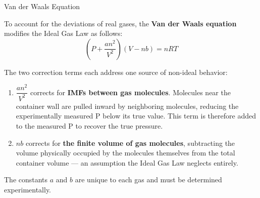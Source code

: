 \documentclass[10pt]{article}
\begin{document}
  \begin{core}{Van der Waals Equation}
      
    To account for the deviations of real gases, the \textbf{Van der Waals equation} modifies the Ideal Gas Law as follows:
    \[
      \left( P + \frac{an^2}{V^2} \right)(V - nb) = nRT
    \]

    The two correction terms each address one source of non-ideal behavior:

    \begin{enumerate}

      \item $\dfrac{an^2}{V^2}$ corrects for \textbf{IMFs between gas molecules}. Molecules near the container wall are pulled inward by neighboring molecules, reducing the experimentally measured P below its true value. This term is therefore added to the measured P to recover the true pressure.

      \item $nb$ corrects for \textbf{the finite volume of gas molecules}, subtracting the volume physically occupied by the molecules themselves from the total container volume --- an assumption the Ideal Gas Law neglects entirely.
        
    \end{enumerate}

    The constants $a$ and $b$ are unique to each gas and must be determined experimentally. 

  \end{core}
\end{document}
